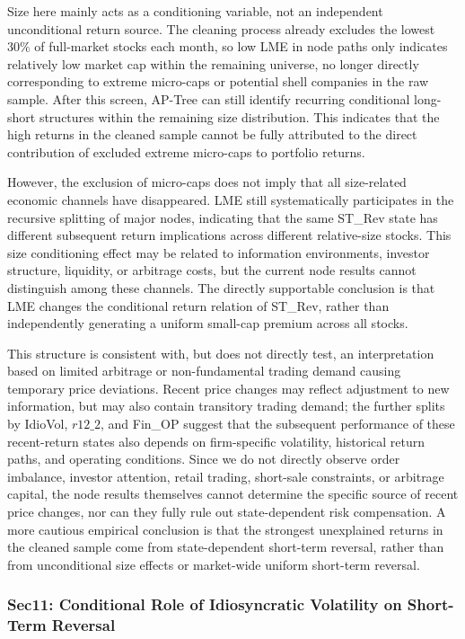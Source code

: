 \documentclass[12pt]{article}
\begin{document}
Size here mainly acts as a conditioning variable, not an independent unconditional return source. The cleaning process already excludes the lowest \(30\%\) of full-market stocks each month, so low LME in node paths only indicates relatively low market cap within the remaining universe, no longer directly corresponding to extreme micro-caps or potential shell companies in the raw sample. After this screen, AP-Tree can still identify recurring conditional long-short structures within the remaining size distribution. This indicates that the high returns in the cleaned sample cannot be fully attributed to the direct contribution of excluded extreme micro-caps to portfolio returns.

However, the exclusion of micro-caps does not imply that all size-related economic channels have disappeared. LME still systematically participates in the recursive splitting of major nodes, indicating that the same ST\_Rev state has different subsequent return implications across different relative-size stocks. This size conditioning effect may be related to information environments, investor structure, liquidity, or arbitrage costs, but the current node results cannot distinguish among these channels. The directly supportable conclusion is that LME changes the conditional return relation of ST\_Rev, rather than independently generating a uniform small-cap premium across all stocks.

This structure is consistent with, but does not directly test, an interpretation based on limited arbitrage or non-fundamental trading demand causing temporary price deviations. Recent price changes may reflect adjustment to new information, but may also contain transitory trading demand; the further splits by IdioVol, \(r12\_2\), and Fin\_OP suggest that the subsequent performance of these recent-return states also depends on firm-specific volatility, historical return paths, and operating conditions. Since we do not directly observe order imbalance, investor attention, retail trading, short-sale constraints, or arbitrage capital, the node results themselves cannot determine the specific source of recent price changes, nor can they fully rule out state-dependent risk compensation. A more cautious empirical conclusion is that the strongest unexplained returns in the cleaned sample come from state-dependent short-term reversal, rather than from unconditional size effects or market-wide uniform short-term reversal.

\subsubsection{Sec11: Conditional Role of Idiosyncratic Volatility on Short-Term Reversal}
\end{document}
